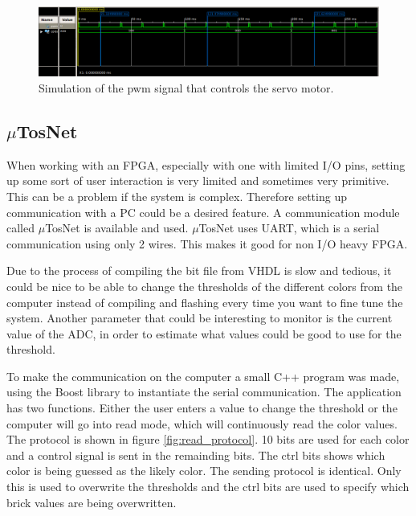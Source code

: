 \begin{figure}[h]
\centering
    \includegraphics[width=0.9\linewidth]{img/pwm_simulation}
    \caption{Simulation of the pwm signal that controls the servo motor.}
    \label{fig:pwm_simulation}
\end{figure}

\subsection{$\mu$TosNet}
When working with an FPGA, especially with one with limited I/O pins, setting up some sort of user interaction is very limited and sometimes very primitive. This can be a problem if the system is complex. Therefore setting up communication with a PC could be a desired feature. A communication module called $\mu$TosNet is available and used. $\mu$TosNet uses UART, which is a serial communication using only 2 wires. This makes it good for non I/O heavy FPGA. 

Due to the process of compiling the bit file from VHDL is slow and tedious, it could be nice to be able to change the thresholds of the different colors from the computer instead of compiling and flashing every time you want to fine tune the system. Another parameter that could be interesting to monitor is the current value of the ADC, in order to estimate what values could be good to use for the threshold. 

To make the communication on the computer a small C++ program was made, using the Boost library to instantiate the serial communication.
The application has two functions.
Either the user enters a value to change the threshold or the computer will go into read mode, which will continuously read the color values.
The protocol is shown in figure \ref{fig:read_protocol}. 10 bits are used for each color and a control signal is sent in the remainding bits. The ctrl bits shows which color is being guessed as the likely color.
The sending protocol is identical. Only this is used to overwrite the thresholds and the ctrl bits are used to specify which brick values are being overwritten.


